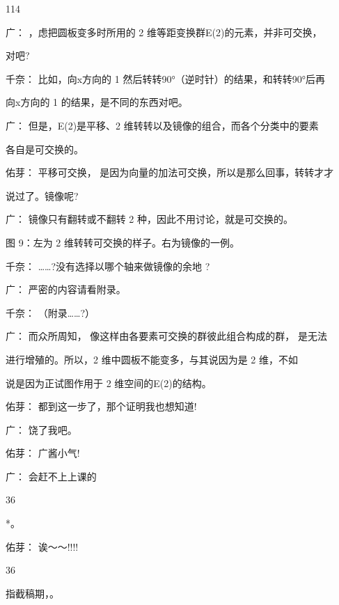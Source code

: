 114\par
广： ，虑把圆板变多时所用的 2 维等距变换群E(2)的元素，并非可交换，\par
对吧?\par
千奈： 比如，向x方向的 1 然后转转90°（逆时针）的结果，和转转90°后再\par
向x方向的 1 的结果，是不同的东西对吧。\par
广： 但是，E(2)是平移、2 维转转以及镜像的组合，而各个分类中的要素\par
各自是可交换的。\par
佑芽： 平移可交换， 是因为向量的加法可交换，所以是那么回事，转转才才\par
说过了。镜像呢?\par
广： 镜像只有翻转或不翻转 2 种，因此不用讨论，就是可交换的。\par
图 9：左为 2 维转转可交换的样子。右为镜像的一例。\par
千奈： ……?没有选择以哪个轴来做镜像的余地 ?\par
广： 严密的内容请看附录。\par
千奈： （附录……?）\par
广： 而众所周知， 像这样由各要素可交换的群彼此组合构成的群， 是无法\par
进行增殖的。所以，2 维中圆板不能变多，与其说因为是 2 维，不如\par
说是因为正试图作用于 2 维空间的E(2)的结构。\par
佑芽： 都到这一步了，那个证明我也想知道!\par
广： 饶了我吧。\par
佑芽： 广酱小气!\par
广： 会赶不上上课的\par
36\par
*。\par
佑芽： 诶～～!!!!\par
36\par
指截稿期，。\par

